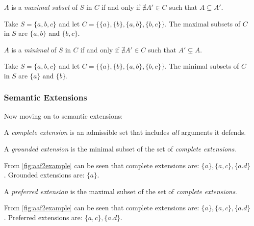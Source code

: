             \begin{definition}
                $A$ is a \textit{maximal subset} of $S$ in $C$ if and only if $\nexists A' \in C$ such that $A \subsetneq A'$.
                \label{definition:definition5}
            \end{definition}
            \begin{exa}
                Take $S = \{a, b, c\}$ and let $C = \{\{a\}, \{b\}, \{a, b\}, \{b, c\}\}$. The maximal subsets of $C$ in $S$ are $\{a, b\}$ and $\{b, c\}$.
                \label{exa:example5}
            \end{exa}
            
            \begin{definition}
                $A$ is a \textit{minimal} of $S$ in $C$ if and only if $\nexists A' \in C$ such that $A' \subsetneq A$.
                \label{definition:definition6}
            \end{definition}
            \begin{exa}
                Take $S = \{a, b, c\}$ and let $C = \{\{a\}, \{b\}, \{a, b\}, \{b, c\}\}$. The minimal subsets of $C$ in $S$ are $\{a\}$ and $\{b\}$.
                \label{exa:example6}
            \end{exa}
        
        \subsubsection{Semantic Extensions}
            Now moving on to semantic extensions:
            \begin{definition}
                A \textit{complete extension} is an admissible set that includes \textit{all} arguments it defends.
                \label{definition:definition7}
            \end{definition}
            
            \begin{definition}
                A \textit{grounded extension} is the minimal subset of the set of \textit{complete extensions}.
                \label{definition:definition8}
            \end{definition}
            \begin{exa}
                From \autoref{fig:aaf2example} can be seen that complete extensions are: $\{a\}, \{a, c\}, \{a. d\}$. Grounded extensions are: $\{a\}$.
                \label{exa:example8}
            \end{exa}
            
            \begin{definition}
                A \textit{preferred extension} is the maximal subset of the set of \textit{complete extensions}.
                \label{definition:definition9}
            \end{definition}
            \begin{exa}
                From \autoref{fig:aaf2example} can be seen that complete extensions are: $\{a\}, \{a, c\}, \{a. d\}$. Preferred extensions are: $\{a, c\}, \{a. d\}$.
                \label{exa:example9}
            \end{exa}
        
